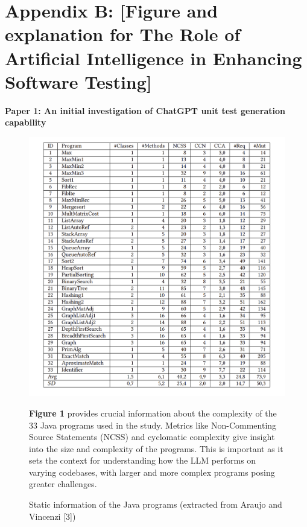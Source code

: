 \documentclass[12pt,a4paper]{article}
\begin{document}
\newpage
\section{Appendix B: [Figure and explanation for The Role of Artificial Intelligence in Enhancing Software Testing]}
\textbf{Paper 1: An initial investigation of ChatGPT unit test generation capability}
\begin{figure}[h]
    \centering
    \includegraphics[width=0.8\linewidth]{table1.png}
    \caption{ Static information of the Java programs (extracted from Araujo and Vincenzi [3])}
    \label{fig:enter-label}
    \vspace{0.8em}
    \textbf{Figure 1} provides crucial information about the complexity of the 33 Java programs used in the study. Metrics like Non-Commenting Source Statements (NCSS) and cyclomatic complexity give insight into the size and complexity of the programs. This is important as it sets the context for understanding how the LLM performs on varying codebases, with larger and more complex programs posing greater challenges.
\end{figure}
\end{document}
